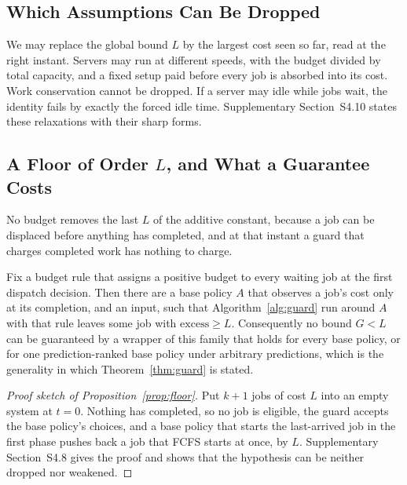 \subsection{Which Assumptions Can Be Dropped}
\label{sec:relax}

We may replace the global bound $L$ by the largest cost seen so far, read at the right
instant. Servers may run at different speeds, with the budget divided by total capacity,
and a fixed setup paid before every job is absorbed into its cost. Work conservation cannot
be dropped. If a server may idle while jobs wait, the identity fails by exactly the forced
idle time. Supplementary Section~S4.10 states these relaxations with their sharp forms.

\subsection{A Floor of Order \texorpdfstring{$L$}{L}, and What a Guarantee Costs}
\label{sec:achievability}

No budget removes the last $L$ of the additive constant, because a job can be displaced
before anything has completed, and at that instant a guard that charges completed work has
nothing to charge.

\begin{proposition}[Floor]
\label{prop:floor}
Fix a budget rule that assigns a positive budget to every waiting job at the first dispatch
decision. Then there are a base policy $A$ that observes a job's cost only at its
completion, and an input, such that Algorithm~\ref{alg:guard} run around $A$ with that rule
leaves some job with $\mathrm{excess} \ge L$. Consequently no bound $G < L$ can be guaranteed by
a wrapper of this family that holds for every base policy, or for one prediction-ranked
base policy under arbitrary predictions, which is the generality in which
Theorem~\ref{thm:guard} is stated.
\end{proposition}

\begin{proof}[Proof sketch of Proposition~\ref{prop:floor}]
Put $k+1$ jobs of cost $L$ into an empty system at $t = 0$. Nothing has completed, so no
job is eligible, the guard accepts the base policy's choices, and a base policy that starts
the last-arrived job in the first phase pushes back a job that FCFS starts at once, by $L$. Supplementary
Section~S4.8 gives the proof and shows that the hypothesis can be neither dropped nor
weakened.
\end{proof}

